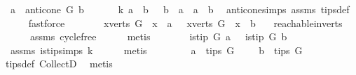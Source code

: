 \begin{isabellebody}
\ {\isachardoublequoteopen}\ a\ {\isasymnotin}\ anticone\ G\ b{\isachardoublequoteclose}\ \isanewline
\ \ \isamarkupfalse%
\ \isamarkupfalse%
\ k{\isacharcolon}{\kern0pt}\ {\isachardoublequoteopen}{\isacharparenleft}{\kern0pt}a\ {\isasymrightarrow}\isactrlsup {\isacharplus}{\kern0pt}\ b\ {\isasymor}\ \ b\ {\isasymrightarrow}\isactrlsup {\isacharplus}{\kern0pt}\ a\ {\isasymor}\ a\ {\isacharequal}{\kern0pt}\ b{\isacharparenright}{\kern0pt}{\isachardoublequoteclose}\ \isamarkupfalse%
\ anticone{\isachardot}{\kern0pt}simps\ assms\ tips{\isacharunderscore}{\kern0pt}def\isanewline
\ \ \ \ \isamarkupfalse%
\ fastforce\ \isanewline
\ \ \isamarkupfalse%
\ \isamarkupfalse%
\ {\isachardoublequoteopen}{\isasymnot}\ {\isacharparenleft}{\kern0pt}{\isasymforall}x{\isasymin}verts\ G{\isachardot}{\kern0pt}\ \ x\ {\isasymrightarrow}\isactrlsup {\isacharplus}{\kern0pt}\ a{\isacharparenright}{\kern0pt}\ {\isasymor}\ {\isasymnot}\ {\isacharparenleft}{\kern0pt}{\isasymforall}x{\isasymin}verts\ G{\isachardot}{\kern0pt}\ \ x\ {\isasymrightarrow}\isactrlsup {\isacharplus}{\kern0pt}\ b{\isacharparenright}{\kern0pt}{\isachardoublequoteclose}\ \isamarkupfalse%
\ \ reachable{}{\isacharunderscore}{\kern0pt}in{\isacharunderscore}{\kern0pt}verts\isanewline
\ \ \ \ \ \ assms{\isacharparenleft}{\kern0pt}{}{\isacharparenright}{\kern0pt}\ cycle{\isacharunderscore}{\kern0pt}free\isanewline
\ \ \ \ \isamarkupfalse%
\ {\isacharparenleft}{\kern0pt}metis{\isacharparenright}{\kern0pt}\ \isanewline
\ \ \isamarkupfalse%
\ \isamarkupfalse%
\ {\isachardoublequoteopen}{\isasymnot}\ is{\isacharunderscore}{\kern0pt}tip\ G\ a\ {\isasymor}\ {\isasymnot}\ is{\isacharunderscore}{\kern0pt}tip\ G\ b{\isachardoublequoteclose}\ \isamarkupfalse%
\ \ assms{\isacharparenleft}{\kern0pt}{}{\isacharparenright}{\kern0pt}\ is{\isacharunderscore}{\kern0pt}tip{\isachardot}{\kern0pt}simps\ k\isanewline
\ \ \ \ \isamarkupfalse%
\ {\isacharparenleft}{\kern0pt}metis{\isacharparenright}{\kern0pt}\isanewline
\ \ \isamarkupfalse%
\ \isamarkupfalse%
\ {\isachardoublequoteopen}\ \ {\isasymnot}\ a\ {\isasymin}\ tips\ G\ {\isasymor}\ \ {\isasymnot}\ \ b\ {\isasymin}\ tips\ G{\isachardoublequoteclose}\ \isamarkupfalse%
\ tips{\isacharunderscore}{\kern0pt}def\ CollectD\ \isamarkupfalse%
\ metis\isanewline
\ \ \isamarkupfalse%

\end{isabellebody}
